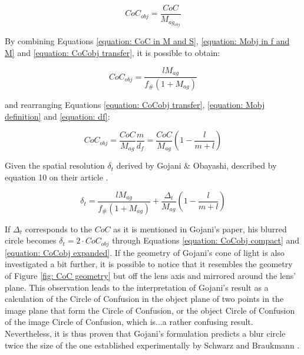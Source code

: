 \begin{equation}
    \label{equation: CoCobj transfer}
    CoC_{obj} = \frac{CoC}{M_{ag_{obj}}}
\end{equation}

By combining Equations \ref{equation: CoC in M and S}, \ref{equation: Mobj in f and M} and \ref{equation: CoCobj transfer}, it is possible to obtain:

\begin{equation}
    \label{equation: CoCobj compact}
    CoC_{obj} = \frac{lM_{ag}}{f_\#(1+M_{ag})}
\end{equation}

and rearranging Equations \ref{equation: CoCobj transfer}, \ref{equation: Mobj definition} and \ref{equation: df}:

\begin{equation}
    \label{equation: CoCobj expanded}
    CoC_{obj} = \frac{CoC}{M_{ag}} \frac{m}{d_f} = \frac{CoC}{M_{ag}} \left( 1 - \frac{l}{m+l}\right)
\end{equation}

Given the spatial resolution $\delta_t$ derived by Gojani \& Obayashi, described by equation 10 on their article \cite{Gojani&Obayashi}.

\begin{equation}
\label{equation: Gojani SR formulation}
    \delta_t = \frac{lM_{ag}}{f_\#(1+M_{ag})} + \frac{\Delta_t}{M_{ag}} \left( 1 - \frac{l}{m+l}\right)
\end{equation}

If $\Delta_t$ corresponds to the $CoC$ as it is mentioned in Gojani's paper, his blurred circle becomes $\delta_t = 2 \cdot CoC_{obj}$ through Equations \ref{equation: CoCobj compact} and \ref{equation: CoCobj expanded}. If the geometry of Gojani's cone of light is also investigated a bit further, it is possible to notice that it resembles the geometry of Figure \ref{fig: CoC geometry} but off the lens axis and mirrored around the lens' plane. This observation leads to the interpretation of Gojani's result as a calculation of the Circle of Confusion in the object plane of two points in the image plane that form the Circle of Confusion, or the object Circle of Confusion of the image Circle of Confusion, which is...a rather confusing result. Nevertheless, it is thus proven that Gojani's formulation predicts a blur circle twice the size of the one established experimentally by Schwarz and Braukmann \cite{Gojani&Obayashi, Schwarz&Braukmann}.
